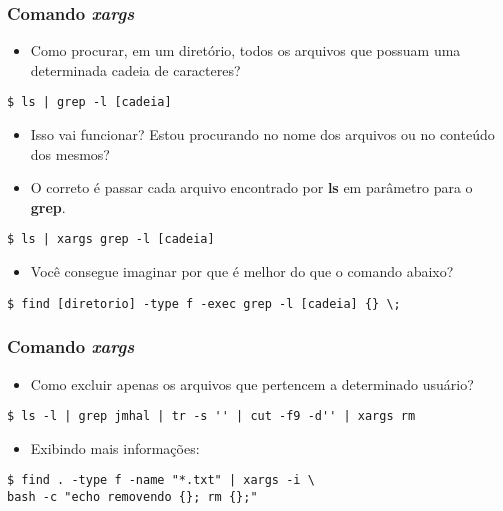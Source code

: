 \documentclass{beamer}
\begin{document}
\begin{frame}[fragile]
   \frametitle{Comando \textit{xargs}}

   \begin{itemize}
      \item Como procurar, em um diretório, todos os arquivos que possuam uma determinada cadeia de caracteres? 
   \end{itemize}
   
   \begin{verbatim}
$ ls | grep -l [cadeia] 
   \end{verbatim}

   \begin{itemize}
      \item Isso vai funcionar? Estou procurando no nome dos arquivos ou no conteúdo dos mesmos?
      \item O correto é passar cada arquivo encontrado por \textbf{ls} em parâmetro para o \textbf{grep}.
   \end{itemize}

   \begin{verbatim}
$ ls | xargs grep -l [cadeia] 
   \end{verbatim}

   \begin{itemize}
      \item Você consegue imaginar por que é melhor do que o comando abaixo? 
   \end{itemize}
   
   \begin{verbatim}
$ find [diretorio] -type f -exec grep -l [cadeia] {} \;
   \end{verbatim}
\end{frame}

\begin{frame}[fragile]
   \frametitle{Comando \textit{xargs}}

   \begin{itemize}
      \item Como excluir apenas os arquivos que pertencem a determinado usuário? 
   \end{itemize}
   
   \small
   \begin{verbatim}
$ ls -l | grep jmhal | tr -s '' | cut -f9 -d'' | xargs rm  
   \end{verbatim}
   \normalsize

   \begin{itemize}
      \item Exibindo mais informações:
   \end{itemize}
   
   \begin{verbatim}
$ find . -type f -name "*.txt" | xargs -i \ 
bash -c "echo removendo {}; rm {};" 
   \end{verbatim}
\end{frame}
\end{document}
